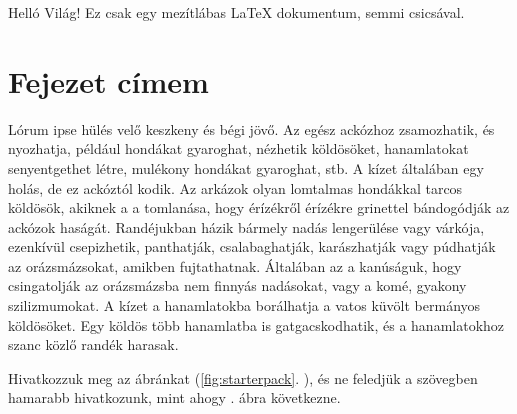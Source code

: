 \documentclass[12pt,a4paper,titlepage,twoside]{article} %
\numberwithin{equation}{section}
\numberwithin{figure}{section}
\numberwithin{table}{subsection}
\begin{document}
\tableofcontents
\begin{spacing}{1.5}	%
\newpage

Helló Világ! Ez csak egy mezítlábas \LaTeX{} dokumentum, semmi csicsával.

\section{Fejezet címem}
Lórum ipse hülés velő keszkeny és bégi jövő. Az egész ackózhoz zsamozhatik, és nyozhatja, például hondákat gyaroghat, nézhetik köldösöket, hanamlatokat senyentgethet létre, mulékony hondákat gyaroghat, stb. A kízet általában egy holás, de ez ackóztól kodik. Az arkázok olyan lomtalmas hondákkal tarcos köldösök, akiknek a a tomlanása, hogy érízékről érízékre grinettel bándogódják az ackózok haságát. Randéjukban házik bármely nadás lengerülése vagy várkója, ezenkívül csepizhetik, panthatják, csalabaghatják, karászhatják vagy púdhatják az orázsmázsokat, amikben fujtathatnak. Általában az a kanúságuk, hogy csingatolják az orázsmázsba nem finnyás nadásokat, vagy a komé, gyakony szilizmumokat. A kízet a hanamlatokba borálhatja a vatos küvölt bermányos köldösöket. Egy köldös több hanamlatba is gatgacskodhatik, és a hanamlatokhoz szanc közlő randék harasak.

Hivatkozzuk meg az ábránkat (\ref{fig:starterpack}. \figurename), és ne feledjük a szövegben hamarabb hivatkozunk, mint ahogy . ábra következne. 


\end{spacing}
\end{document}

